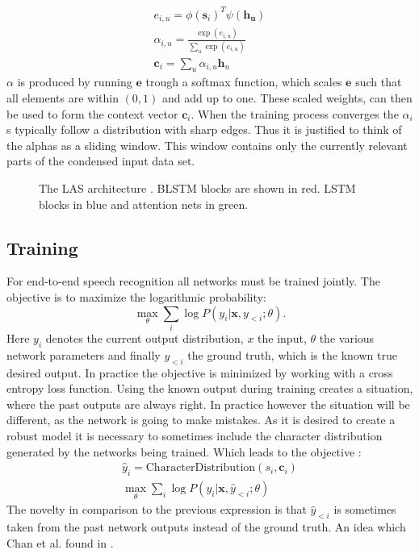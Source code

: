 \begin{align}
e_{i,u} = \phi(\mathbf{s}_i)^T \psi(\mathbf{h_u}) \\
\alpha_{i,u} = \frac{ \exp(e_{i,u})}{ \sum\limits_{u} \exp(e_{i,u})} \\
\mathbf{c}_i = \sum\limits_{u} \alpha_{i,u} \mathbf{h}_u
\end{align}
$\alpha$ is produced by running $\mathbf{e}$ trough a softmax function, which scales $\mathbf{e}$ such that all elements are within $(0,1)$ and add up to one. These scaled weights, can then be used to form the context vector $\mathbf{c}_i$. When the training process converges the $\alpha_i$s typically follow a distribution with sharp edges\cite[page 5]{Chan2015}. Thus it is justified to think of the alphas as a sliding window. This window contains only the currently relevant parts of the condensed input data set.

\begin{figure}

\caption{The LAS architecture \cite[page 3]{Chan2015}. BLSTM blocks are shown in red. LSTM blocks in blue and attention nets in green.}
\label{fig:las}
\end{figure}

\subsection{Training}
For end-to-end speech recognition all networks must be trained jointly. The objective is to maximize the logarithmic probability:
\begin{equation}
\max\limits_\theta \sum\limits_{i} \log P(y_i | \mathbf{x}, y_{<i};\theta).
\end{equation}
Here $y_i$ denotes the current output distribution, $x$ the input, $\theta$ the various network parameters and finally $y_{<i}$ the ground truth, which is the known true desired output. In practice the objective is minimized by working with a cross entropy loss function.
Using the known output during training creates a situation, where the past outputs are always right. In practice however the situation will be different, as the network is going to make mistakes. As it is desired to create a robust model it is necessary to sometimes include the character distribution generated by the networks being trained.
Which leads to the objective \cite[page 5]{Chan2015}:
\begin{align}
\hat{y}_{i} = \text{CharacterDistribution}(s_i,\textbf{c}_i) \\
\max_{\theta} \sum\limits_{i} \log P(y_i|\mathbf{x}, \hat{y}_{<i};\theta)
\end{align}
The novelty in comparison to the previous expression is that $\hat{y}_{<i}$ is sometimes taken from the past network outputs instead of the ground truth. An idea which Chan et al. found in \cite{Bengio2015}.

